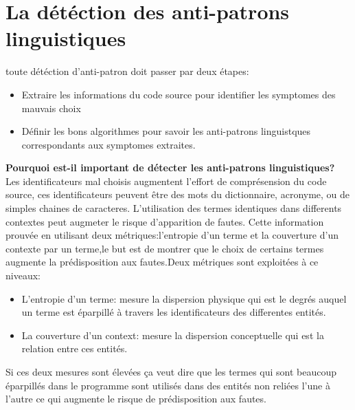 \section{La détéction des anti-patrons linguistiques}
toute détéction d’anti-patron doit passer par deux étapes\cite{brown1998antipatterns}:
\begin{itemize}
    

\item Extraire les informations du code source pour identifier les symptomes des mauvais choix
\item Définir les bons algorithmes pour savoir les anti-patrons linguistques correspondants aux symptomes extraites.
\end{itemize}
\textbf{Pourquoi est-il important de détecter les anti-patrons linguistiques?}\\
Les identificateurs mal choisis augmentent l’effort de comprésension du code source, ces identificateurs peuvent être des mots du dictionnaire, acronyme, ou de simples chaines de caracteres.
L’utilisation des termes identiques dans differents contextes peut augmeter le risque d’apparition de fautes. Cette information prouvée en utilisant deux métriques:l’entropie d’un terme et la couverture d’un contexte par un terme,le but est de montrer que le choix de certains termes augmente la prédisposition aux fautes.Deux métriques sont exploitées à ce niveaux:
\begin{itemize}
    

\item L’entropie d'un terme:  mesure la dispersion physique qui est  le degrés auquel un terme est éparpillé à travers les identificateurs des differentes entités\cite{arnaoudova2010defining}.
\item La couverture d’un context: mesure la dispersion conceptuelle qui est la relation entre ces entités\cite{arnaoudova2010defining}.
\end{itemize}
Si ces deux mesures sont élevées ça veut dire que les termes qui sont beaucoup éparpillés dans le programme  sont utilisés dans des entités non reliées l’une à l’autre  ce qui augmente le risque de prédisposition aux fautes.\\

